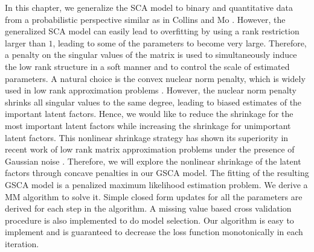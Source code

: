 In this chapter, we generalize the SCA model to binary and quantitative data from a probabilistic perspective similar as in Collins \cite{collins2002generalization} and Mo \cite{mo2013pattern}. However, the generalized SCA model can easily lead to overfitting by using a rank restriction larger than $1$, leading to some of the parameters to become very large. Therefore, a penalty on the singular values of the matrix is used to simultaneously induce the low rank structure in a soft manner and to control the scale of estimated parameters. A natural choice is the convex nuclear norm penalty, which is widely used in low rank approximation problems \cite{koltchinskii2011nuclear, groenen2016multinomial, wu2015fast}. However, the nuclear norm penalty shrinks all singular values to the same degree, leading to biased estimates of the important latent factors. Hence, we would like to reduce the shrinkage for the most important latent factors while increasing the shrinkage for unimportant latent factors. This nonlinear shrinkage strategy has shown its superiority in recent work of low rank matrix approximation problems under the presence of Gaussian noise \cite{gavish2017optimal, josse2016adaptive}. Therefore, we will explore the nonlinear shrinkage of the latent factors through concave penalties in our GSCA model. The fitting of the resulting GSCA model is a penalized maximum likelihood estimation problem. We derive a MM \cite{de1994block,hunter2004tutorial} algorithm to solve it. Simple closed form updates for all the parameters are derived for each step in the algorithm. A missing value based cross validation procedure is also implemented to do model selection. Our algorithm is easy to implement and is guaranteed to decrease the loss function monotonically in each iteration.

